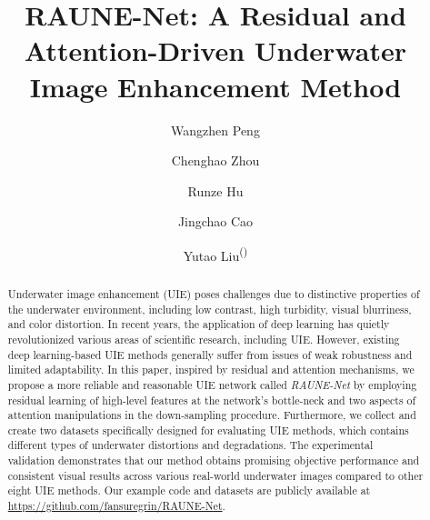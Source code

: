 \documentclass[runningheads]{llncs}
\begin{document}
\title{RAUNE-Net: A Residual and Attention-Driven Underwater Image Enhancement Method}

\author{Wangzhen Peng\and Chenghao Zhou \and Runze Hu \and Jingchao Cao \and Yutao Liu\textsuperscript{(\Letter)}}
%
%

\maketitle %

\begin{abstract}
Underwater image enhancement (UIE) poses challenges due to distinctive properties of the underwater environment, including low contrast, high turbidity, visual blurriness, and color distortion. In recent years, the application of deep learning has quietly revolutionized various areas of scientific research, including UIE. However, existing deep learning-based UIE methods generally suffer from issues of weak robustness and limited adaptability. In this paper, inspired by residual and attention mechanisms, we propose a more reliable and reasonable UIE network called \textit{RAUNE-Net} by employing residual learning of high-level features at the network's bottle-neck and two aspects of attention manipulations in the down-sampling procedure. Furthermore, we collect and create two datasets specifically designed for evaluating UIE methods, which contains different types of underwater distortions and degradations. The experimental validation demonstrates that our method obtains promising objective performance and consistent visual results across various real-world underwater images compared to other eight UIE methods. Our example code and datasets are publicly available at \href{https://github.com/fansuregrin/RAUNE-Net}{https://github.com/fansuregrin/RAUNE-Net}.

\end{abstract}
\end{document}
